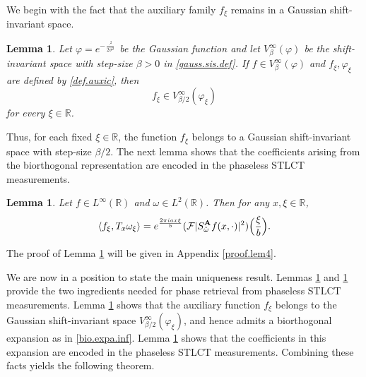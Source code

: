 \documentclass[11pt, reqno]{amsart}
\newtheorem{lemma}[theorem]{Lemma}%
\newcommand{\R}{\mathbb{R}}
\numberwithin{equation}{section}
\begin{document}
\smallskip

We begin with the fact that the auxiliary family $f_\xi$ remains in a Gaussian shift-invariant space.


\begin{lemma}\cite[Proposition 3.3]{grohs2024stable}\label{auxi.lem}
	Let $\varphi=e^{-\frac{\cdot^2}{2\sigma^2}}$  be the Gaussian function and let $V_{\beta}^{\infty}(\varphi)$ be the shift-invariant space with step-size $\beta>0$ in \eqref{gauss.sis.def}. If $f\in V_{\beta}^{\infty}(\varphi)$ and $f_\xi, \varphi_\xi$ are defined by  \eqref{def.auxic}, then
	$$f_\xi \in V_{\beta/2}^{\infty}(\varphi_\xi)$$
	for every $\xi\in \R$. 
\end{lemma}

Thus, for each fixed $\xi\in\R$, the function $f_\xi$ belongs to a Gaussian shift-invariant space with step-size $\beta/2$. The next lemma shows that the coefficients arising from the biorthogonal  representation are encoded in the phaseless STLCT measurements.

\begin{lemma}\label{lem4}
	Let $f\in L^{\infty}(\R)$ and $\omega\in L^2(\R)$. Then for any $x, \xi\in \R$,
	\begin{equation}\label{eq1}
		\langle f_\xi, T_x \omega_\xi \rangle
		= e^{\frac{2\pi iax\xi}{b}} (\mathcal{F} |S_{\check{\omega}}^{\mathbf{A}} f(x,\cdot)|^2)\Bigl(\frac{\xi}{b}\Bigr).
	\end{equation}
\end{lemma}

The proof of Lemma \ref{lem4} will be given in Appendix \ref{proof.lem4}.

\medskip 


We are now in a position to state the main uniqueness result.  Lemmas \ref{auxi.lem} and \ref{lem4} provide the two ingredients needed for phase retrieval from phaseless STLCT measurements.  Lemma \ref{auxi.lem} shows that  the auxiliary function $f_\xi$ belongs to the Gaussian shift-invariant space $V_{\beta/2}^{\infty}(\varphi_\xi)$, and hence admits a biorthogonal expansion as in \eqref{bio.expa.inf}. Lemma \ref{lem4} shows that the coefficients in this expansion are encoded in the phaseless STLCT measurements. Combining these facts yields the following theorem.
\end{document}
